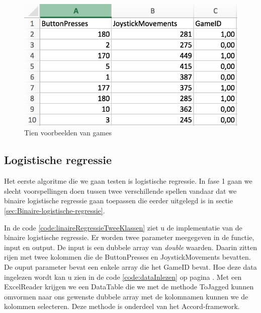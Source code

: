 \begin{figure}[]
	\centering
	\includegraphics{img/Dataset}
	\caption{Tien voorbeelden van games}
	\label{fig:regressieFig}
\end{figure}


\newpage

\subsection{Logistische regressie}
\label{sec:Logistischeregressie-fase1}

Het eerste algoritme die we gaan testen is logistische regressie. In fase 1 gaan we slecht voorspellingen doen tussen twee verschillende spellen vandaar dat we binaire logistische regressie gaan toepassen die eerder uitgelegd is in sectie \ref{sec:Binaire-logistische-regressie}.

In de code \ref{code:linaireRegressieTweeKlassen} ziet u de implementatie van de binaire logistische regressie. Er worden twee parameter meegegeven in de functie, input en output. De input is een dubbele array van \textit{double} waarden. Daarin zitten rijen met twee kolommen die de ButtonPresses en JoystickMovements bevatten. De ouput parameter bevat een enkele array die het GameID bevat. Hoe deze data ingelezen wordt kan u zien in de code \ref{code:dataInlezen} op pagina \pageref{code:dataInlezen}. Met een ExcelReader krijgen we een DataTable die we met de methode ToJagged kunnen omvormen naar ons gewenste dubbele array met de kolomnamen kunnen we de kolommen selecteren. Deze methode is onderdeel van het Accord-framework. 



